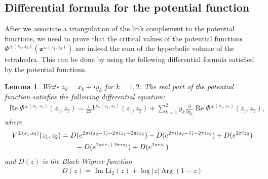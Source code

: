 \documentclass[10pt,a4paper]{article}
\def \Re{\operatorname{Re}}
\newtheorem{lemma}{Lemma}
\def \Re{\operatorname{Re}}
\def \im{\operatorname{Im}}
\def \Li{\operatorname{Li_2}}
\def \im{\operatorname{Im}}
\def \Arg{\operatorname{Arg}}
\begin{document}
\subsection{Differential formula for the potential function}\label{diffsame}
After we associate a triangulation of the link complement to the potential functions, we need to prove that the critical values of the potential functions $\Phi^{\pm(s_1,s_2)}(\mathbf{z}^{\pm(z_1,z_2)})$ are indeed the sum of the hyperbolic volume of the tetrahedra. This can be done by using the following differential formula satisfied by the potential functions.
\begin{lemma}
Write $z_k = x_k + i y_k$ for $k=1,2$. The real part of the potential function satisfies the following differential equation:
\begin{align} 
\Re \Phi^{\pm(s_1,s_2)}(z_1,z_2) = \frac{1}{2\pi} V^{\pm(s_1,s_2)}(z_1,z_2) + \sum_{k=1}^2 y_k \frac{\partial}{\partial y_k} \Re \Phi^{\pm(s_1,s_2)}(z_1,z_2),
\end{align}
where 
\begin{align}
V^{\pm(s_1,s_2)}(z_1,z_2) 
&= D(e^{2\pi i(s_2-1) - 2\pi i z_1 - 2\pi i z_2}) - D(e^{2\pi i (s_2-1) - 2\pi i z_2}) + D(e^{2\pi i z_2}) \notag \\
&\qquad - D(e^{2\pi i z_1 + 2\pi i z_2}) + D(e^{2\pi i z_1}) 
\end{align}
and $D(z)$ is the Bloch-Wigner function
\begin{align}
D(z) = \im\Li(z) + \log|z|\Arg(1-z)
\end{align}
\end{lemma}
\end{document}
